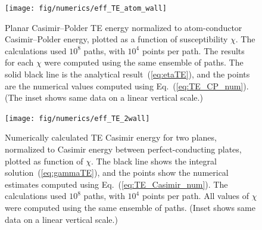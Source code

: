 \begin{figure}
  \centering
 \texttt{[image: fig/numerics/eff\_TE\_atom\_wall]}
  \caption[Planar Casimir--Polder TE energy as function of $\chi$]
  {Planar Casimir--Polder TE energy normalized to atom-conductor Casimir--Polder energy, plotted as a function of susceptibility $\chi$.  
    The calculations used $10^8$ paths, with $10^4$ points per path.
    The results for each $\chi$ were computed using the same ensemble of paths.
    The solid black line is the analytical result~(\ref{eq:etaTE}), and the points are the numerical
    values computed using Eq.~(\ref{eq:TE_CP_num}).  
    (The inset shows same data on a linear vertical scale.)
    }
  \label{fig:eff_TE_atom_wall}
\end{figure}



\begin{figure}
  \centering
  \texttt{[image: fig/numerics/eff\_TE\_2wall]}
  \caption[Planar TE Casimir energy as function of $\chi$.]{
    Numerically calculated TE Casimir energy for two planes, normalized to Casimir energy between perfect-conducting plates,
    plotted as function of $\chi$.
    The black line shows the integral solution~(\ref{eq:gammaTE}), and the points show the numerical
    estimates computed using Eq.~(\ref{eq:TE_Casimir_num}).
    The calculations used $10^8$ paths, with $10^4$ points per path.  All values of $\chi$ were computed 
    using the same ensemble of paths.
    (Inset shows same data on a linear vertical scale.)}
  \label{fig:eff_TE_2wall}
\end{figure}


